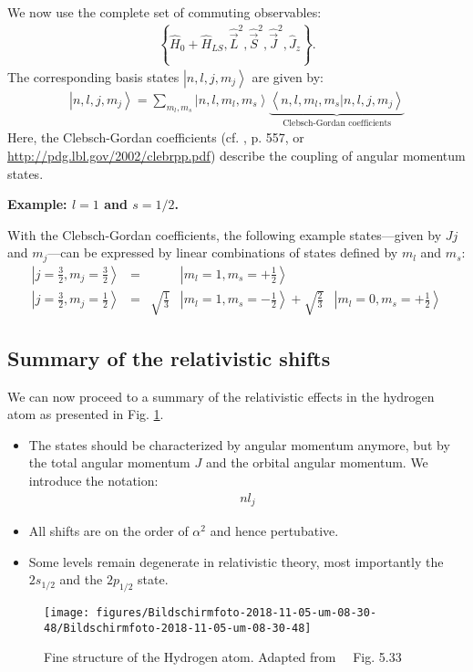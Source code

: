 \documentclass[10pt]{article}
\let\cite\citep
\providecommand\citep{\cite}
\newcommand{\ket}[1]{\ensuremath{\left|#1\right\rangle}}
\newcommand{\braket}[1]{\ensuremath{\left\langle#1\right\rangle}}
\begin{document}
We now use the complete set of commuting observables:
\begin{align}
\left\{ \hat{H}_0 + \hat{H}_{LS}, \hat{\vec{L}}^2,\hat{\vec{S}}^2, \hat{\vec{J}}^2, \hat{J}_z \right\}.
\end{align}
The corresponding basis states $\ket{n,l,j,m_j}$ are given by:
%
\begin{align}
\ket{n,l,j,m_j} = \sum_{m_l,m_s} \ket{n, l, m_l, m_s} \underbrace{\braket{n, l, m_l, m_s | n, l, j, m_j}}_{\text{Clebsch-Gordan coefficients}}
\end{align}
%
Here, the Clebsch-Gordan coefficients (cf. \cite{Olive_2014}, p. 557, or \url{http://pdg.lbl.gov/2002/clebrpp.pdf}) describe the coupling of angular momentum states.



\textbf{Example: $l=1$ and $s=1/2$.}

With the Clebsch-Gordan coefficients, the following example states---given by $Jj$ and $m_j$---can be expressed by linear combinations of states defined by $m_l$ and $m_s$:
%
\begin{align}
\ket{j=\frac{3}{2}, m_j = \frac{3}{2}} &=&& \ket{m_l=1, m_s = +\frac{1}{2}}\\
\ket{j=\frac{3}{2}, m_j = \frac{1}{2}} &= &\sqrt{\frac{1}{3}} &\ket{m_l=1, m_s = -\frac{1}{2}} +\sqrt{\frac{2}{3}} &\ket{m_l = 0, m_s = +\frac{1}{2}}
\end{align}

\subsection{Summary of the relativistic shifts}
We can now proceed to a summary of the relativistic effects in the hydrogen atom as presented in Fig. \ref{391959}.

\begin{itemize}
\item The states should be characterized by angular momentum anymore, but by the total angular momentum $J$ and the orbital angular momentum. We introduce the notation:
\begin{align}
nl_{j}
\end{align}
\item All shifts are on the order of $\alpha^2$ and hence pertubative.
\item Some levels remain degenerate in relativistic theory, most importantly the $2s_{1/2}$ and the $2p_{1/2}$ state.
\end{itemize}
\begin{figure}[h!]
\begin{center}
\texttt{[image: figures/Bildschirmfoto-2018-11-05-um-08-30-48/Bildschirmfoto-2018-11-05-um-08-30-48]}
\caption{{Fine structure of the Hydrogen atom. Adapted from~\protect\cite{Demtr_der_2010}~
Fig. 5.33
{\label{391959}}%
}}
\end{center}
\end{figure}
\end{document}
